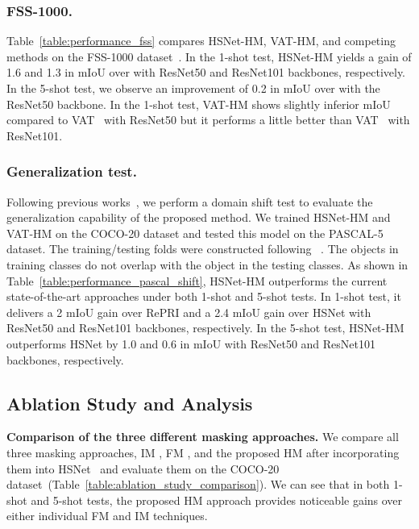 \documentclass[runningheads]{llncs}
\begin{document}
\subsubsection{FSS-1000.} 
Table~\ref{table:performance_fss} compares HSNet-HM, VAT-HM, and competing methods on the FSS-1000 dataset~\cite{FSS1000}. In the 1-shot test, HSNet-HM yields a gain of 1.6 and 1.3 in mIoU over \cite{HSNet} with ResNet50 and ResNet101 backbones, respectively. In the 5-shot test, we observe an improvement of 0.2 in mIoU over \cite{HSNet} with the ResNet50 backbone. In the 1-shot test, VAT-HM shows slightly inferior mIoU compared to VAT~\cite{VAT} with ResNet50 but it performs a little better than VAT~\cite{VAT} with ResNet101. 


\subsubsection{Generalization test.} 
Following previous works~\cite{HSNet,RePRI}, we perform a domain shift test to evaluate the generalization capability of the proposed method. We trained HSNet-HM and VAT-HM on the COCO-20 dataset and tested this model on the PASCAL-5 dataset. The training/testing folds were constructed following ~\cite{RePRI,HSNet}. The objects in training classes do not overlap with the object in the testing classes. As shown in Table~\ref{table:performance_pascal_shift}, HSNet-HM outperforms the current state-of-the-art approaches under both 1-shot and 5-shot tests. In 1-shot test, it delivers a 2 mIoU gain over RePRI\cite{RePRI} and a 2.4  mIoU gain over HSNet\cite{HSNet} with ResNet50 and ResNet101 backbones, respectively.
In the 5-shot test, HSNet-HM outperforms HSNet\cite{HSNet} by 1.0 and 0.6 in mIoU with ResNet50 and ResNet101 backbones, respectively.




\subsection{Ablation Study and Analysis}
\noindent\textbf{Comparison of the three different masking approaches.}
We compare all three masking approaches, IM \cite{OSLSM}, FM \cite{Zhang2020SGOneSG}, and the proposed HM after incorporating them into HSNet~\cite{HSNet} and evaluate them on the COCO-20 dataset~(Table~\ref{table:ablation_study_comparison}). We can see that in both 1-shot and 5-shot tests, the proposed HM approach provides noticeable gains over either individual FM and IM techniques. 
\end{document}
